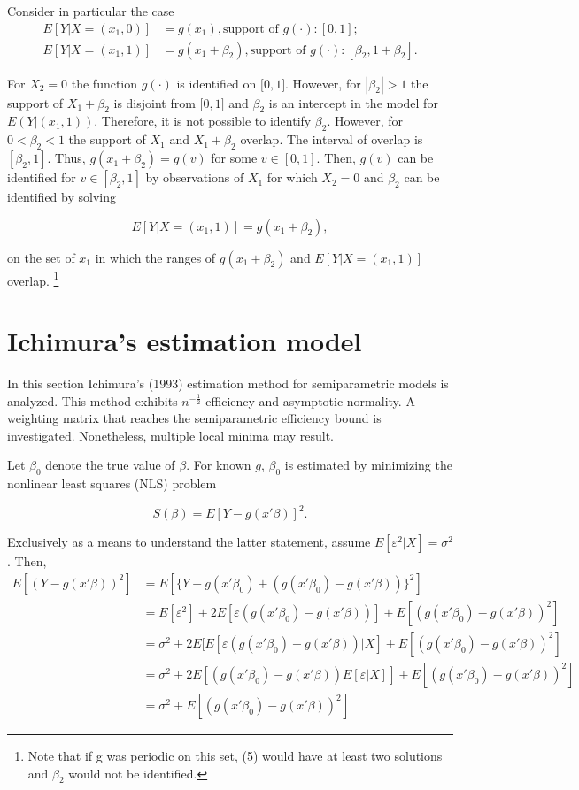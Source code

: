 \documentclass[a4paper]{article}
\begin{document}
Consider in particular the case
\[
\begin{split}
E[Y| X = (x_1,0)]& = g(x_1), \text{support\ of } g(\cdot): [0,1];  \\
E[Y| X = (x_1,1)]& = g(x_1+\beta_2), \text{support\ of } g(\cdot): [\beta_2,1+\beta_2].
\end{split}
\]

For $X_2 = 0$ the function $g(\cdot)$ is identified on $\big[0,1\big]$. However, for $|\beta_2| > 1$ the support of $ X_1 + \beta_2$ is disjoint from $\big[0,1\big]$ and $\beta_2$ is an intercept in the model for $E(Y|(x_1,1))$. Therefore, it is not possible to identify $\beta_2$. However, for $0<\beta_2 < 1$ the support of $X_1$ and $X_1 + \beta_2$ overlap. The interval of overlap is $[\beta_2, 1]$. Thus, $g(x_1 + \beta_2) = g(v)$ for some $v \in [0,1]$. Then, $g(v)$ can be identified for $v \in [\beta_2, 1]$ by observations of $X_1$ for which $X_2 = 0$ and $\beta_2$ can be identified by solving

\begin{equation}
E[Y| X = (x_1,1)] = g(x_1 + \beta_2),
\end{equation}

on the set of $x_1$ in which the ranges of $g(x_1 + \beta_2)$ and $E[Y| X = (x_1,1)]$ overlap. \footnote{Note that if g was periodic on this set, (5) would have at least two solutions and $\beta_2$ would not be identified.}


\section{Ichimura's estimation model} %
\label{sec:Ichimura's estimation model}

In this section Ichimura's (1993) \cite{[6]} estimation method for semiparametric models is analyzed. This method exhibits $n^{-\frac{1}{2}}$ efficiency and asymptotic normality. A weighting matrix that reaches the semiparametric efficiency bound is investigated. Nonetheless, multiple local minima may result. 

Let $\beta_0$ denote the true value of $\beta$. For known $g$, $\beta_0$ is estimated by minimizing the nonlinear least squares (NLS) problem

\[
S(\beta) = E[Y - g(x'\beta)]^2. \]

Exclusively as a means to understand the latter statement, assume $E[\varepsilon^2|X]=\sigma^2$. Then,
\begin{align*}
E[(Y - g(x'\beta))^2] & = E[\{Y - g(x'\beta_0) + (g(x'\beta_0) - g(x'\beta))\}^2]\\
                   & = E[\varepsilon^2] + 2E[\varepsilon (g(x'\beta_0) - g(x'\beta)) ] + E[(g(x'\beta_0) - g(x'\beta))^2]\\                 & = \sigma^2 + 2E[E[\varepsilon (g(x'\beta_0) - g(x'\beta))|X] + E[(g(x'\beta_0) - g(x'\beta))^2]  \\
                   &= \sigma^2 + 2E[(g(x'\beta_0) - g(x'\beta))E[\varepsilon|X]] + E[(g(x'\beta_0) - g(x'\beta))^2] \\
                   &= \sigma^2 + E[(g(x'\beta_0) - g(x'\beta))^2]
\end{align*}
\end{document}
